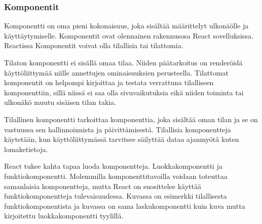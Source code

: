 \subsubsection{Komponentit}











Komponentti on oma pieni kokonaisuus, joka sisältää määrittelyt ulkonäölle ja käyttäytymiselle.
Komponentit ovat olennainen rakennusosa React sovelluksissa.
Reactissa Komponentit voivat olla tilallisia tai tilattomia. 
\medskip



Tilaton komponentti ei sisällä omaa tilaa. 
Niiden päätarkoitus on renderöidä käyttöliittymää niille annettujen ominaisuuksien perusteella.
Tilattomat komponentit on helpompi kirjoittaa ja testata verrattuna tilalliseen komponenttiin, 
sillä niissä ei saa olla sivuvaikutuksia eikä niiden toiminta tai ulkonäkö muutu sisäisen tilan takia.
\medskip


Tilallinen komponentti tarkoittaa komponenttia, 
joka sisältää oman tilan ja se on vastuussa sen hallinnoinnista ja päivittämisestä.
Tilallisia komponentteja käytetään, kun käyttöliittymässä tarvitsee säilyttää dataa ajanmyötä 
kuten lomaketietoja.\\
\medskip







React tukee kahta tapaa luoda komponentteja. Luokkakomponentti ja funktiokomponentti.
Molemmilla komponenttitavoilla voidaan toteuttaa samanlaisia komponentteja, mutta React on suosittelee käyttää funktiokomponentteja tulevaisuudessa. 
Kuvassa \nextImageCount {} on esimerkki tilallisesta funktiokomponentista ja
kuvassa \nextnextImageCount {} on sama laskukomponentti kuin kuva \nextImageCount{} mutta kirjoitettu luokkakomponentti tyylillä. 
\medskip


